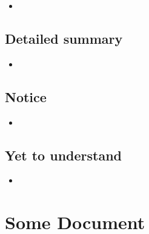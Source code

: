 \documentclass{article}
\begin{document}
    \begin{itemize}

    \item 
    
    \end{itemize}

\subsection{Detailed summary}

    \begin{itemize}

    \item 
    
    \end{itemize}

\subsection{Notice}

    \begin{itemize}

    \item 
    
    \end{itemize}

\subsection{Yet to understand}

    \begin{itemize}

    \item 
    
    \end{itemize}

\section{Some Document}
\end{document}
